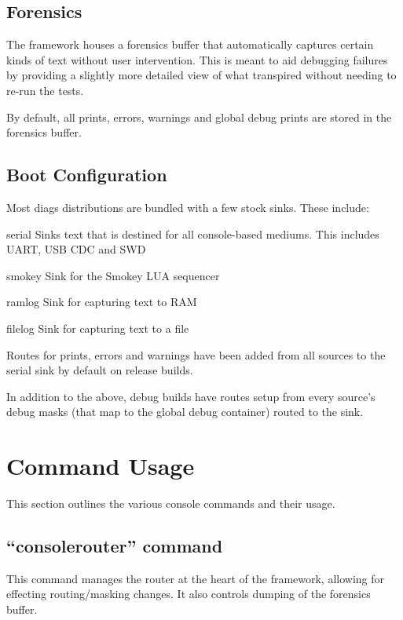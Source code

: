 \subsection{Forensics}

The framework houses a forensics buffer that automatically captures certain kinds of text without user intervention. This is meant 
to aid debugging failures by providing a slightly more detailed view of what transpired without needing to re-run the tests. 

By default, all prints, errors, warnings and global debug prints are stored in the forensics buffer.

\subsection{Boot Configuration}

Most diags distributions are bundled with a few stock sinks. These include:

\begin{Definition}
\item[serial] Sinks text that is destined for all console-based mediums. This includes UART, USB CDC and SWD
\item[smokey] Sink for the Smokey LUA sequencer
\item[ramlog] Sink for capturing text to RAM
\item[filelog] Sink for capturing text to a file
\end{Definition}

Routes for prints, errors and warnings have been added from all sources to the serial sink by default on release builds. 

In addition to the above, debug builds have routes setup from every source's debug masks (that map to the global debug container) routed to the  sink.

\section{Command Usage}

This section outlines the various console commands and their usage. 

\subsection{``consolerouter'' command}

This command manages the router at the heart of the framework, allowing for effecting routing/masking changes. It also controls 
dumping of the forensics buffer. 

